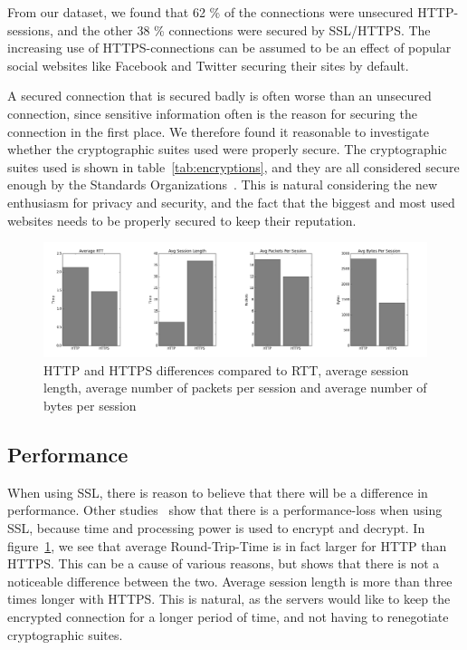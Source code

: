 \documentclass[letterpaper,twocolumn,10pt]{article}
\begin{document}
From our dataset, we found that 62 \% of the connections were unsecured HTTP-sessions, and the other 38 \% connections were secured by SSL/HTTPS. The increasing use of HTTPS-connections can be assumed to be an effect of popular social websites like Facebook and Twitter securing their sites by default.

A secured connection that is secured badly is often worse than an unsecured connection, since sensitive information often is the reason for securing the connection in the first place. We therefore found it reasonable to investigate whether the cryptographic suites used were properly secure. The cryptographic suites used is shown in table~\ref{tab:encryptions}, and they are all considered secure enough by the Standards Organizations~\cite{NIST}. This is natural considering the new enthusiasm for privacy and security, and the fact that the biggest and most used websites needs to be properly secured to keep their reputation.

\begin{figure}[!htb] 
\begin{center} 
\includegraphics[width=7in]{combined.png} 
\caption{HTTP and HTTPS differences compared to RTT, average session length, average number of packets per session and average number of bytes per session} 
\label{fig:combined}
\end{center} 
\end{figure}

\subsection{Performance}

When using SSL, there is reason to believe that there will be a difference in performance. Other studies~\cite{SSL} show that there is a performance-loss when using SSL, because time and processing power is used to encrypt and decrypt. In figure~\ref{fig:combined}, we see that average Round-Trip-Time is in fact larger for HTTP than HTTPS. This can be a cause of various reasons, but shows that there is not a noticeable difference between the two. Average session length is more than three times longer with HTTPS. This is natural, as the servers would like to keep the encrypted connection for a longer period of time, and not having to renegotiate cryptographic suites.
\end{document}
